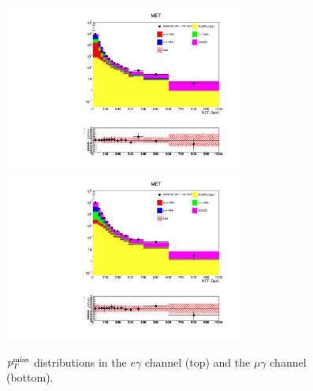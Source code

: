 \documentclass[thesis.tex]{subfiles}
\renewcommand\_{\textunderscore\allowbreak}
\begin{document}
\begin{figure}[hbtp]
  \centering
    \includegraphics[width=0.7\textwidth]{Figures/VALID_egamma_2016ReMiniAOD_met.pdf} \\
    \includegraphics[width=0.7\textwidth]{Figures/VALID_mg_2016ReMiniAOD_met.pdf} 
  \caption{$p_T^\textrm{miss}$ distributions in the $e\gamma$ channel (top) and the $\mu\gamma$ channel (bottom).}
    \label{fig:metvalidation}
\end{figure}
\end{document}
